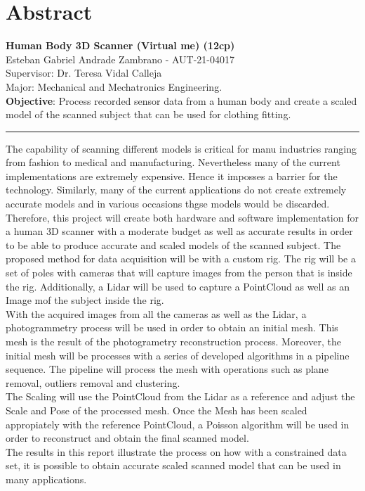 \documentclass[12pt]{report}
\begin{document}
\chapter*{Abstract}
\textbf{Human Body 3D Scanner (Virtual me) (12cp)}\\
Esteban Gabriel Andrade Zambrano - AUT-21-04017\\
Supervisor: Dr. Teresa Vidal Calleja\\
Major: Mechanical and Mechatronics Engineering.\\
\textbf{Objective}: Process recorded sensor data from a human body and create a scaled model of the scanned subject that can be used for clothing fitting.\\
\rule{\textwidth}{0.1pt}
The capability of scanning different models is critical for manu industries ranging from fashion to medical and manufacturing. Nevertheless many of the current implementations are extremely expensive. Hence it imposses a barrier for the technology.
Similarly, many of the current applications do not create extremely accurate models and in various occasions thgse models would be discarded.\\
Therefore, this project will create both hardware and software implementation for a human 3D scanner with a moderate budget as well as accurate results  in order to be able to produce accurate and scaled models of the scanned subject.
The proposed method for data acquisition will be with a custom rig. The rig will be a set of poles with cameras that will capture images from the person that is inside the rig. 
Additionally, a Lidar will be used to capture a PointCloud as well as an Image mof the subject inside the rig.\\
With the acquired images from all the cameras as well as the Lidar, a photogrammetry process will be used in order to obtain an initial mesh. This mesh is the result of the photogrametry reconstruction process.
Moreover, the initial mesh will be processes with a series of developed algorithms in a pipeline sequence. The pipeline will process the mesh with operations such as plane removal, outliers removal and clustering.\\
The Scaling will use the PointCloud from the Lidar as a reference and adjust the Scale and Pose of the processed mesh. Once the Mesh has been scaled appropiately with the reference PointCloud, a Poisson algorithm will be used in order to reconstruct and obtain the final scanned model.\\
The results in this report illustrate the process on how with a constrained data set, it is possible to obtain accurate scaled scanned model that can be used in many applications.
\enlargethispage{\baselineskip}
\end{document}
